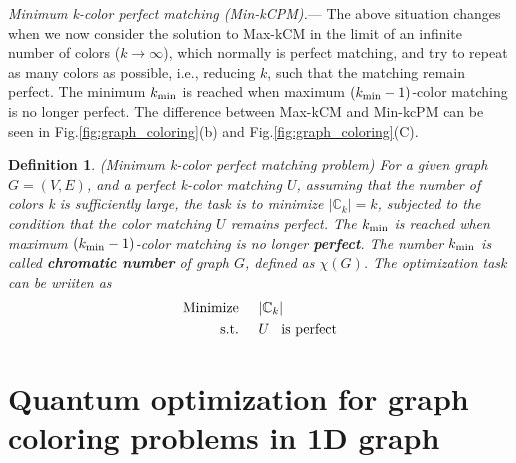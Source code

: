 \documentclass[%
 reprint,
nofootinbib,
 amsmath,amssymb,
 aps,
pra,
floatfix,
]{revtex4-2}
\newtheorem{definition}{Definition}
\begin{document}
\emph{Minimum k-color perfect matching {\rm (Min-kCPM)}.}---  The above situation changes when we now consider the solution to Max-kCM in the limit of an infinite number of colors ($k \to \infty$), which normally is perfect matching, and try to repeat as many colors as possible, i.e., reducing $k$,  such that the matching remain perfect. The minimum $k_{\rm min}$ is reached when maximum $(k_{\rm min}-1)$-color matching is no longer perfect. The difference between Max-kCM and Min-kcPM can be seen in Fig.\ref{fig:graph_coloring}(b) and Fig.\ref{fig:graph_coloring}(C).
\begin{definition}
\label{def:minimum-k-color-perfect-matching-problem}
{\rm (Minimum k-color perfect matching problem)} For a given graph $G=(V,E)$, and a perfect k-color matching $U$, assuming that the number of colors k is sufficiently large, the task is to minimize $|\mathbb{C}_k| = k$, subjected to the condition that the color matching $U$ remains perfect. The $k_{\rm min}$ is reached when maximum $(k_{\rm min}-1)$-color matching is no longer {\rm \textbf{perfect}}. The number $k_{\rm min}$ is called {\rm \textbf{chromatic number}} of graph $G$, defined as $\chi(G)$. The optimization task can be wriiten as 
\begin{align}\label{eq-min-kcpm}
\text{\rm Minimize} \hspace{5mm} &|\mathbb{C}_k|  \nonumber \\
\text{\rm s.t.} \hspace{5mm} &U \hspace{3mm} \text{\rm is perfect}
\end{align}
\end{definition}

\section{Quantum optimization for graph coloring problems in 1D graph}
\end{document}
